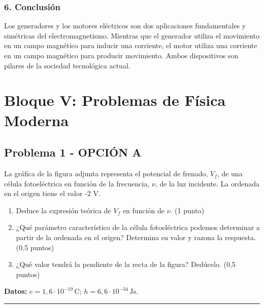 \subsubsection*{6. Conclusión}
\begin{cajaconclusion}
Los generadores y los motores eléctricos son dos aplicaciones fundamentales y simétricas del electromagnetismo. Mientras que el generador utiliza el movimiento en un campo magnético para inducir una corriente, el motor utiliza una corriente en un campo magnético para producir movimiento. Ambos dispositivos son pilares de la sociedad tecnológica actual.
\end{cajaconclusion}

\newpage

\section{Bloque V: Problemas de Física Moderna}
\label{sec:moderna_2006_jun_ord}

\subsection{Problema 1 - OPCIÓN A}
\label{subsec:5A_2006_jun_ord}

\begin{cajaenunciado}
La gráfica de la figura adjunta representa el potencial de frenado, $V_f$, de una célula fotoeléctrica en función de la frecuencia, $\nu$, de la luz incidente. La ordenada en el origen tiene el valor -2 V.
\begin{enumerate}
    \item Deduce la expresión teórica de $V_f$ en función de $\nu$. (1 punto)
    \item ¿Qué parámetro característico de la célula fotoeléctrica podemos determinar a partir de la ordenada en el origen? Determina su valor y razona la respuesta. (0.5 puntos)
    \item ¿Qué valor tendrá la pendiente de la recta de la figura? Dedúcelo. (0,5 puntos)
\end{enumerate}
\textbf{Datos:} $e=1,6\cdot10^{-19}\,\text{C}$; $h=6,6\cdot10^{-34}\,\text{Js}$.
\end{cajaenunciado}
\hrule

